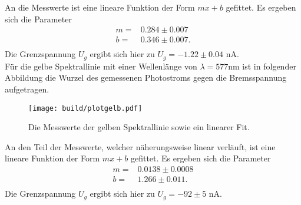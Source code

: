 \noindent
An die Messwerte ist eine lineare Funktion der Form $mx +b$ gefittet. Es ergeben
sich die Parameter
\begin{align*}
  m = & 0.284 \pm 0.007 \\
  b = & 0.346 \pm 0.007.\\
\end{align*}
Die Grenzspannung $U_g$ ergibt sich hier zu $ U_g = -1.22 \pm 0.04$ \si{\nano\ampere}. \\
\noindent
Für die gelbe Spektrallinie mit einer Wellenlänge von $\lambda = 577 \si{\nano\meter}$
ist in folgender Abbildung die Wurzel des gemessenen Photostroms gegen die Bremsspannung
aufgetragen.
\begin{figure}[H]
  \centering
  \texttt{[image: build/plotgelb.pdf]}
  \label{fig:plotgelb}
  \caption{Die Messwerte der gelben Spektrallinie sowie ein linearer Fit.}
\end{figure}
\noindent
An den Teil der Messwerte, welcher näherungsweise linear verläuft, ist eine lineare Funktion der Form $mx +b$ gefittet. Es ergeben sich die Parameter
\begin{align*}
  m = & 0.0138 \pm 0.0008 \\
  b = & 1.266 \pm 0.011.\\
\end{align*}
Die Grenzspannung $U_g$ ergibt sich hier zu $ U_g = -92 \pm 5$ \si{\nano\ampere}. \\
